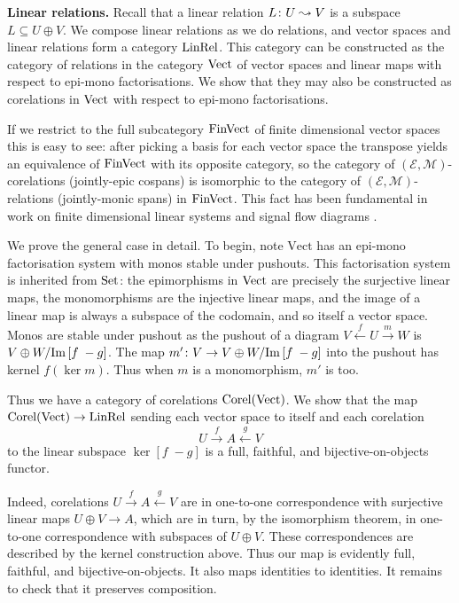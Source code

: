 \begin{example}
  \textbf{Linear relations.} 
  Recall that a linear relation $L{\colon} U \leadsto V$ is a subspace $L \subseteq
  U \oplus V$. We compose linear relations as we do relations, and vector spaces
  and linear relations form a category $\mathrm{LinRel}$. This category can be
  constructed as the category of relations in the category $\mathrm{Vect}$ of
  vector spaces and linear maps with respect to epi-mono factorisations. We show
  that they may also be constructed as corelations in $\mathrm{Vect}$ with respect to
  epi-mono factorisations.
  
  If we restrict to the full subcategory $\mathrm{FinVect}$ of finite dimensional vector
  spaces this is easy to see: after picking a basis for each vector space the
  transpose yields an equivalence of $\mathrm{FinVect}$ with its opposite category, so
  the category of $(\mathcal E,\mathcal M)$-corelations (jointly-epic cospans)
  is isomorphic to the category of $(\mathcal E,\mathcal M)$-relations
  (jointly-monic spans) in $\mathrm{FinVect}$. This fact has been fundamental in work on
  finite dimensional linear systems and signal flow diagrams \cite{BE,BSZ,FRS}.
  
  We prove the general case in detail. To begin, note $\mathrm{Vect}$ has an
  epi-mono factorisation system with monos stable under pushouts. This
  factorisation system is inherited from $\mathrm{Set}$: the epimorphisms in $\mathrm{Vect}$ are
  precisely the surjective linear maps, the monomorphisms are the injective
  linear maps, and the image of a linear map is always a subspace of the
  codomain, and so itself a vector space. Monos are stable under pushout as the
  pushout of a diagram $V \stackrel{f}{\leftarrow} U \stackrel{m}{\rightarrow}
  W$ is $V \oplus W/\mathrm{Im}\,[f\; -g]$. The map $m'{\colon} V \to V \oplus W/\mathrm{Im}\,[f\; -g]$
  into the pushout has kernel $f(\ker m)$. Thus when $m$ is a monomorphism, $m'$
  is too.
 
  Thus we have a category of corelations $\operatorname{{Corel}}(\mathrm{Vect})$. We show that the map
  $\operatorname{{Corel}}(\mathrm{Vect}) \to \mathrm{LinRel}$ sending each vector space to itself and each
  corelation
  \[
    U \xrightarrow{f} A \xleftarrow{g} V
  \]
  to the linear subspace $\ker[f\;-g]$ is a full, faithful, and
  bijective-on-objects functor.

  Indeed, corelations $U \xrightarrow{f} A \xleftarrow{g} V$ are in one-to-one
  correspondence with surjective linear maps $U\oplus V \to A$, which are in
  turn, by the isomorphism theorem, in one-to-one correspondence with subspaces
  of $U\oplus V$. These correspondences are described by the kernel construction
  above. Thus our map is evidently full, faithful, and bijective-on-objects. It
  also maps identities to identities. It remains to check that it preserves
  composition.


\end{example}
